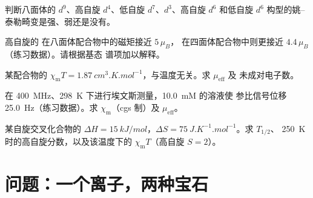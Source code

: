 \begin{exercise}[$\star\star$]\label{exo:b3:complex-spectra-magnetism:8}
判断八面体的 $d^9$、高自旋
$d^4$、低自旋 $d^7$、$d^3$、高自旋 $d^6$ 和低自旋 $d^6$ 构型的姚–泰勒畸变是强、弱还是没有。
\end{exercise}

\begin{exercise}[$\star\star$]\label{exo:b3:complex-spectra-magnetism:9}
高自旋的  在八面体配合物中的磁矩接近 $5\,\mu_B$，
在四面体配合物中则更接近 $4.4\,\mu_B$（练习数据）。请根据基态
谱项加以解释。
\end{exercise}

\begin{exercise}[$\star\star\star$]\label{exo:b3:complex-spectra-magnetism:10}
某配合物的 $\chi_{\mathrm m}T = \qty{1.87}{cm^3.K.mol^{-1}}$，与温度无关。求 $\mu_{\mathrm{eff}}$ 及
未成对电子数。
\end{exercise}

\begin{exercise}[$\star\star\star$]\label{exo:b3:complex-spectra-magnetism:11}
在 \qty{400}{MHz}、\qty{298}{K} 下进行埃文斯测量，\qty{10.0}{mM} 的溶液使
参比信号位移 \qty{25.0}{Hz}（练习数据）。求 $\chi_{\mathrm m}$（cgs 制）及 $\mu_{\mathrm{eff}}$。
\end{exercise}

\begin{exercise}[$\star\star\star$]\label{exo:b3:complex-spectra-magnetism:12}
某自旋交叉化合物的 $\Delta H = \qty{15}{kJ/mol}$，$\Delta S = \qty{75}{J.K^{-1}.mol^{-1}}$。求 $T_{1/2}$、
\qty{250}{K} 时的高自旋分数，以及该温度下的 $\chi_{\mathrm m}T$（高自旋 $S = 2$）。
\end{exercise}

\section{问题：一个离子，两种宝石}

